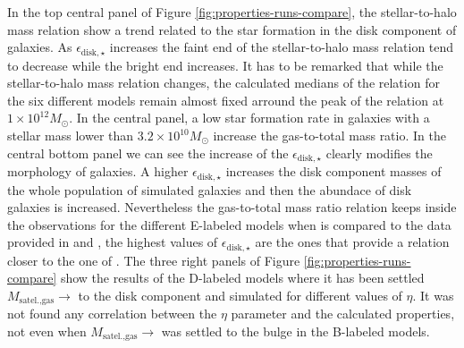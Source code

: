 \documentclass[usenatbib]{mn2e}
\begin{document}
In the top central panel of Figure \ref{fig:properties-runs-compare}, the stellar-to-halo mass relation show a trend related to the star 
formation in the disk component of galaxies. As  $\epsilon_{\text{disk},\star}$  increases the faint end of the stellar-to-halo mass relation tend to 
decrease while the bright end increases. It has to be remarked that while the stellar-to-halo mass relation changes, the calculated medians of the relation 
for the six different models remain almost fixed arround the peak of the relation at $1\times 10^{12}M_{\odot}$. In the central panel,  a low star formation
 rate in galaxies with a stellar mass lower than $3.2\times 10^{10}M_{\odot}$ increase the gas-to-total mass ratio.  In the  central bottom panel we can see 
the increase of the $\epsilon_{\text{disk},\star}$ clearly modifies the morphology of galaxies. A higher  $\epsilon_{\text{disk},\star}$ increases the disk 
component masses of the whole population of simulated galaxies and then the abundace of disk galaxies is increased.  Nevertheless the gas-to-total mass 
ratio relation keeps inside the observations for the different E-labeled models when is compared to the data provided in \cite{2003ApJS..149..289B} and 
\cite{2003ApJ...585L.117B}, the highest values of 
$\epsilon_{\text{disk},\star}$ are the ones that provide a relation  closer to the one of \cite{2010ApJ...710..903M}. The  three right panels of Figure 
\ref{fig:properties-runs-compare} show the results of the D-labeled models where it has been settled $M_{\text{satel.,gas}}\to$ to the disk component and
 simulated for different values of $\eta$. It was not found any correlation between the $\eta$ parameter and the calculated properties, not even when
 $M_{\text{satel.,gas}}\to$ was settled to the bulge in the B-labeled models.
\end{document}
